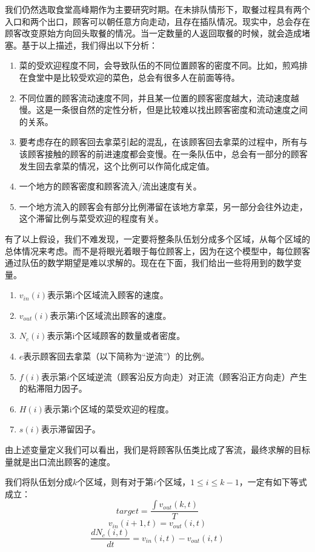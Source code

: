 \documentclass[lang=cn,10pt,a4paper]{elegantpaper}
\begin{document}
我们仍然选取食堂高峰期作为主要研究时期。在未排队情形下，取餐过程具有两个入口和两个出口，顾客可以朝任意方向走动，且存在插队情况。现实中，总会存在顾客改变原始方向回头取餐的情况。当一定数量的人返回取餐的时候，就会造成堵塞。基于以上描述，我们得出以下分析：
\begin{enumerate}
\item 菜的受欢迎程度不同，会导致队伍的不同位置顾客的密度不同。比如，煎鸡排在食堂中是比较受欢迎的菜色，总会有很多人在前面等待。
\item 不同位置的顾客流动速度不同，并且某一位置的顾客密度越大，流动速度越慢。这是一条很自然的定性分析，但是比较难以找出顾客密度和流动速度之间的关系。
\item 要考虑存在的顾客回去拿菜引起的混乱，在该顾客回去拿菜的过程中，所有与该顾客接触的顾客的前进速度都会变慢。在一条队伍中，总会有一部分的顾客发生回去拿菜的情况，这个比例可以作简化成定值。
\item 一个地方的顾客密度和顾客流入/流出速度有关。
\item 一个地方流入的顾客会有部分比例滞留在该地方拿菜，另一部分会往外边走，这个滞留比例与菜受欢迎的程度有关。
\end{enumerate}


有了以上假设，我们不难发现，一定要将整条队伍划分成多个区域，从每个区域的总体情况来考虑。而不是将眼光着眼于每位顾客上，因为在这个模型中，每位顾客通过队伍的数学期望是难以求解的。现在在下面，我们给出一些将用到的数学变量。
\begin{enumerate}
\item $v_{in}(i)$表示第i个区域流入顾客的速度。
\item $v_{out}(i)$表示第i个区域流出顾客的速度。
\item $N_{c}(i)$表示第i个区域顾客的数量或者密度。
\item $e$表示顾客回去拿菜（以下简称为“逆流”）的比例。
\item $f(i)$表示第$i$个区域逆流（顾客沿反方向走）对正流（顾客沿正方向走）产生的粘滞阻力因子。
\item $H(i)$表示第i个区域的菜受欢迎的程度。
\item $s(i)$表示滞留因子。
\end{enumerate}


由上述变量定义我们可以看出，我们是将顾客队伍类比成了客流，最终求解的目标量就是出口流出顾客的速度。


我们将队伍划分成$k$个区域，则有对于第$i$个区域，$1 \leqslant i \leqslant k-1$，一定有如下等式成立：
\begin{equation}
target = \frac{\int v_{out}(k,t)}{T}
\end{equation}
\begin{equation}
v_{in}(i+1,t)=v_{out}(i,t)
\end{equation}
\begin{equation}
\frac{dN_{c}(i,t)}{dt} = v_{in}(i,t)-v_{out}(i,t)
\end{equation}
\end{document}
